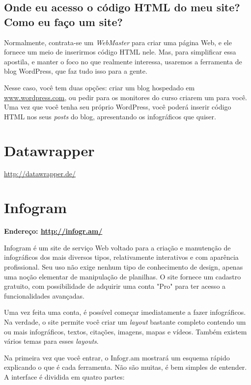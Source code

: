 \documentclass[12pt,onecolumn]{article}
\begin{document}
  \subsection{Onde eu acesso o código HTML do meu site? Como eu faço um site?}
    Normalmente, contrata-se um \textit{WebMaster} para criar uma página Web, e
    ele fornece um meio de inserirmos código HTML nele. Mas, para simplificar
    essa apostila, e manter o foco no que realmente interessa, usaremos a
    ferramenta de blog WordPress, que faz tudo isso para a gente.
    
    Nesse caso, você tem duas opções: criar um blog hospedado em
    \url{www.wordpress.com}, ou pedir para os monitores do curso criarem um
    para você\footnotemark. Uma vez que você tenha seu próprio WordPress, você
    poderá inserir código HTML nos seus \textit{posts} do blog, apresentando os
    infográficos que quiser.
    

\clearpage
\section{Datawrapper}
  \url{http://datawrapper.de/}

\clearpage
\section{Infogram}
  \textbf{Endereço: \url{http://infogr.am/}}
  
  Infogram é um site de serviço Web voltado para a criação e manutenção de
  infográficos dos mais diversos tipos, relativamente interativos e com
  aparência profissional. Seu uso não exige nenhum tipo de conhecimento de
  design, apenas uma noção elementar de manipulação de planilhas. O site fornece
  um cadastro gratuito, com possibilidade de adquirir uma conta "Pro" para ter
  acesso a funcionalidades avançadas.
  
  Uma vez feita uma conta, é possível começar imediatamente a fazer
  infográficos. Na verdade, o site permite você criar um \textit{layout}
  bastante completo contendo um ou mais infográficos, textos, citações, imagens,
  mapas e vídeos. Também existem vários temas para esses \textit{layouts}.
  
  Na primeira vez que você entrar, o Infogr.am mostrará um esquema rápido
  explicando o que é cada ferramenta. Não são muitas, é bem simples de entender.
  A interface é dividida em quatro partes:
  
\end{document}
